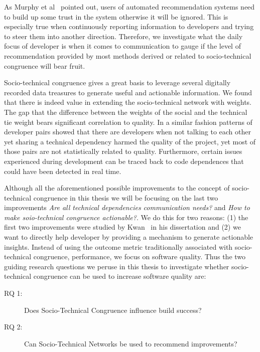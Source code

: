 As Murphy et al~\cite{murphy:rsse:2010} pointed out, users of automated recommendation systems need to build up some trust in the system otherwise it will be ignored.
This is especially true when continuously reporting information to developers and trying to steer them into another direction.
Therefore, we investigate what the daily focus of developer is when it comes to communication to gauge if the level of recommendation provided by most methods derived or related to socio-technical congruence will bear fruit.

Socio-technical congruence gives a great basis to leverage several digitally recorded data treasures to generate useful and actionable information.
We found that there is indeed value in extending the socio-technical network with weights.
The gap that the difference between the weights of the social and the technical tie weight bears significant correlation to quality.
In a similar fashion patterns of developer pairs showed that there are developers when not talking to each other yet sharing a technical dependency harmed the quality of the project, yet most of those pairs are not statistically related to quality.
Furthermore, certain issues experienced during development can be traced back to code dependences that could have been detected in real time.

Although all the aforementioned possible improvements to the concept of socio-technical congruence in this thesis we will be focusing on the last two improvements \emph{Are all technical dependencies communication needs?} and \emph{How to make soio-technical congruence actionable?}.
We do this for two reasons: (1) the first two improvements were studied by Kwan~\cite{kwan:phd} in his dissertation and (2) we want to directly help developer by providing a mechanism to generate actionable insights.
Instead of using the outcome metric traditionally associated with socio-technical congruence, performance, we focus on software quality.
Thus the two guiding research questions we peruse in this thesis to investigate whether socio-technical congruence can be used to increase software quality are:
\begin{description}
\item[RQ 1:] Does Socio-Technical Congruence influence build success?
\item[RQ 2:] Can Socio-Technical Networks be used to recommend improvements?
\end{description}

